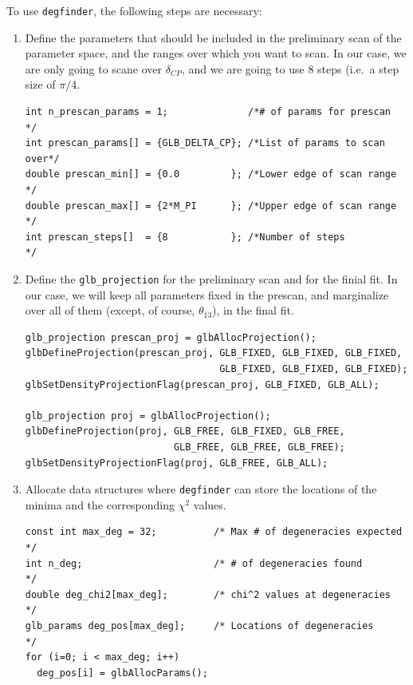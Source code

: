 \documentclass[12pt,a4paper]{article}
\theoremstyle{dotless}
\begin{document}
To use {\tt degfinder}, the following steps are necessary:
\begin{enumerate}
  \item Define the parameters that should be included in the preliminary
    scan of the parameter space, and the ranges over which you want to
    scan. In our case, we are only going to scane over $\delta_{CP}$, and
    we are going to use 8 steps (i.e.\ a step size of $\pi/4$.
    \begin{verbatim}
int n_prescan_params = 1;              /*# of params for prescan    */
int prescan_params[] = {GLB_DELTA_CP}; /*List of params to scan over*/
double prescan_min[] = {0.0         }; /*Lower edge of scan range   */
double prescan_max[] = {2*M_PI      }; /*Upper edge of scan range   */
int prescan_steps[]  = {8           }; /*Number of steps            */
    \end{verbatim}

  \item Define the {\tt glb\_projection} for the preliminary scan and
    for the finial fit. In our case, we will keep all parameters
    fixed in the prescan, and marginalize over all of them (except,
    of course, $\theta_{13}$), in the final fit.
    \begin{verbatim}
glb_projection prescan_proj = glbAllocProjection();
glbDefineProjection(prescan_proj, GLB_FIXED, GLB_FIXED, GLB_FIXED,
                                  GLB_FIXED, GLB_FIXED, GLB_FIXED);
glbSetDensityProjectionFlag(prescan_proj, GLB_FIXED, GLB_ALL);

glb_projection proj = glbAllocProjection();
glbDefineProjection(proj, GLB_FREE, GLB_FIXED, GLB_FREE,
                          GLB_FREE, GLB_FREE, GLB_FREE);
glbSetDensityProjectionFlag(proj, GLB_FREE, GLB_ALL);
    \end{verbatim}

  \item Allocate data structures where {\tt degfinder} can store the
    locations of the minima and the corresponding $\chi^2$ values.
    \begin{verbatim}
const int max_deg = 32;          /* Max # of degeneracies expected */
int n_deg;                       /* # of degeneracies found        */
double deg_chi2[max_deg];        /* chi^2 values at degeneracies   */
glb_params deg_pos[max_deg];     /* Locations of degeneracies      */
for (i=0; i < max_deg; i++)
  deg_pos[i] = glbAllocParams();
    \end{verbatim}


\end{enumerate}
\end{document}
